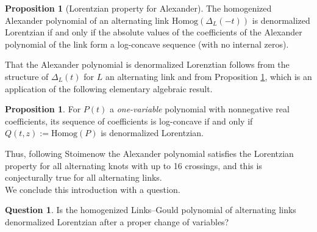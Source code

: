\documentclass[12pt,reqno]{amsart}
\theoremstyle{definition}
\newtheorem{proposition}[theorem]{Proposition}
\newtheorem{question}[theorem]{Question}
\begin{document}
\begin{proposition}[Lorentzian property for Alexander] \label{conj.4}
The homogenized Alexander polynomial of an alternating link $\mathrm{Homog}(\Delta_L(-t))$ is denormalized Lorentzian if and only if the absolute values of the coefficients of the Alexander polynomial of the link form a log-concave sequence (with no internal zeros).
\end{proposition}

That the Alexander polynomial is denormalized Lorenztian follows from the structure of $\Delta_L(t)$ for $L$ an alternating link and from Proposition \ref{conj.4}, which is an application of the following elementary algebraic result.

\begin{proposition}\label{algebraic lemma}
For $P(t)$ a \emph{one-variable} polynomial with nonnegative real coefficients, its sequence of coefficients is log-concave if and only if $Q(t,z) := \mathrm{Homog}(P)$ is denormalized Lorentzian.
\end{proposition}


Thus, following Stoimenow \cite{Sto} the Alexander polynomial satisfies the Lorentzian property for all alternating knots with up to 16 crossings, and this is conjecturally true for all alternating links. \\


We conclude this introduction with a question.

\begin{question}
    Is the homogenized Links--Gould polynomial of alternating links denormalized Lorentzian after a proper change of variables?
\end{question}



\end{document}
